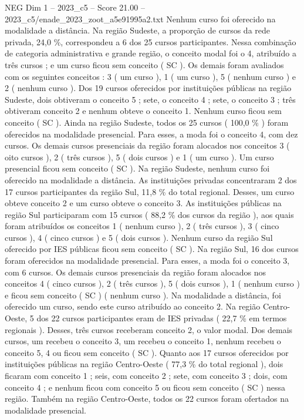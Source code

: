\begin{textsample}{NEG Dim 1 – 2023\_c5 – Score 21.00 – 2023\_c5/enade\_2023\_zoot\_a5e91995a2.txt}
Nenhum curso foi oferecido na modalidade a distância.
Na região Sudeste, a proporção de cursos da rede privada, 24,0 \%, correspondeu a 6 dos 25 cursos participantes.
Nessa combinação de categoria administrativa e grande região, o conceito modal foi o 4, atribuído a três cursos ; e um curso ficou sem conceito ( SC ).
Os demais foram avaliados com os seguintes conceitos : 3 ( um curso ), 1 ( um curso ), 5 ( nenhum curso ) e 2 ( nenhum curso ).
Dos 19 cursos oferecidos por instituições públicas na região Sudeste, dois obtiveram o conceito 5 ; sete, o conceito 4 ; sete, o conceito 3 ; três obtiveram conceito 2 e nenhum obteve o conceito 1.
Nenhum curso ficou sem conceito ( SC ).
Ainda na região Sudeste, todos os 25 cursos ( 100,0 \% ) foram oferecidos na modalidade presencial.
Para esses, a moda foi o conceito 4, com dez cursos.
Os demais cursos presenciais da região foram alocados nos conceitos 3 ( oito cursos ), 2 ( três cursos ), 5 ( dois cursos ) e 1 ( um curso ).
Um curso presencial ficou sem conceito ( SC ).
Na região Sudeste, nenhum curso foi oferecido na modalidade a distância.
As instituições privadas concentraram 2 dos 17 cursos participantes da região Sul, 11,8 \% do total regional.
Desses, um curso obteve conceito 2 e um curso obteve o conceito 3.
As instituições públicas na região Sul participaram com 15 cursos ( 88,2 \% dos cursos da região ), aos quais foram atribuídos os conceitos 1 ( nenhum curso ), 2 ( três cursos ), 3 ( cinco cursos ), 4 ( cinco cursos ) e 5 ( dois cursos ).
Nenhum curso da região Sul oferecido por IES públicas ficou sem conceito ( SC ).
Na região Sul, 16 dos cursos foram oferecidos na modalidade presencial.
Para esses, a moda foi o conceito 3, com 6 cursos.
Os demais cursos presenciais da região foram alocados nos conceitos 4 ( cinco cursos ), 2 ( três cursos ), 5 ( dois cursos ), 1 ( nenhum curso ) e ficou sem conceito ( SC ) ( nenhum curso ).
Na modalidade a distância, foi oferecido um curso, sendo este curso atribuído ao conceito 2.
Na região Centro-Oeste, 5 dos 22 cursos participantes eram de IES privadas ( 22,7 \% em termos regionais ).
Desses, três cursos receberam conceito 2, o valor modal.
Dos demais cursos, um recebeu o conceito 3, um recebeu o conceito 1, nenhum recebeu o conceito 5, 4 ou ficou sem conceito ( SC ).
Quanto aos 17 cursos oferecidos por instituições públicas na região Centro-Oeste ( 77,3 \% do total regional ), dois ficaram com conceito 1 ; seis, com conceito 2 ; sete, com conceito 3 ; dois, com conceito 4 ; e nenhum ficou com conceito 5 ou ficou sem conceito ( SC ) nessa região.
Também na região Centro-Oeste, todos os 22 cursos foram ofertados na modalidade presencial.

\end{textsample}
